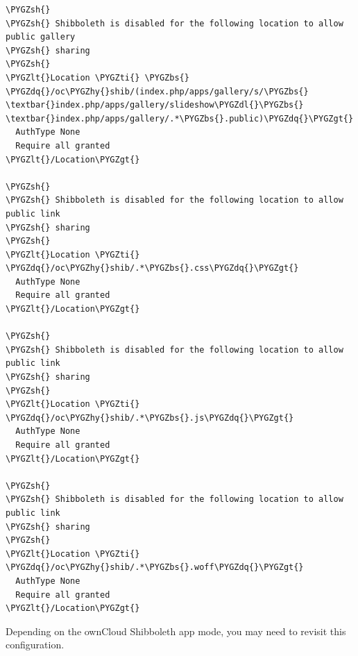 \documentclass[letterpaper,10pt,english]{sphinxmanual}
\def\PYGZbs{\char`\\}
\def\PYGZlt{\char`\<}
\def\PYGZgt{\char`\>}
\def\PYGZsh{\char`\#}
\def\PYGZdl{\char`\$}
\def\PYGZhy{\char`\-}
\def\PYGZdq{\char`\"}
\def\PYGZti{\char`\~}
\begin{document}
\begin{Verbatim}[commandchars=\\\{\}]
\PYGZsh{}
\PYGZsh{} Shibboleth is disabled for the following location to allow public gallery
\PYGZsh{} sharing
\PYGZsh{}
\PYGZlt{}Location \PYGZti{} \PYGZbs{}
\PYGZdq{}/oc\PYGZhy{}shib/(index.php/apps/gallery/s/\PYGZbs{}
\textbar{}index.php/apps/gallery/slideshow\PYGZdl{}\PYGZbs{}
\textbar{}index.php/apps/gallery/.*\PYGZbs{}.public)\PYGZdq{}\PYGZgt{}
  AuthType None
  Require all granted
\PYGZlt{}/Location\PYGZgt{}

\PYGZsh{}
\PYGZsh{} Shibboleth is disabled for the following location to allow public link
\PYGZsh{} sharing
\PYGZsh{}
\PYGZlt{}Location \PYGZti{} \PYGZdq{}/oc\PYGZhy{}shib/.*\PYGZbs{}.css\PYGZdq{}\PYGZgt{}
  AuthType None
  Require all granted
\PYGZlt{}/Location\PYGZgt{}

\PYGZsh{}
\PYGZsh{} Shibboleth is disabled for the following location to allow public link
\PYGZsh{} sharing
\PYGZsh{}
\PYGZlt{}Location \PYGZti{} \PYGZdq{}/oc\PYGZhy{}shib/.*\PYGZbs{}.js\PYGZdq{}\PYGZgt{}
  AuthType None
  Require all granted
\PYGZlt{}/Location\PYGZgt{}

\PYGZsh{}
\PYGZsh{} Shibboleth is disabled for the following location to allow public link
\PYGZsh{} sharing
\PYGZsh{}
\PYGZlt{}Location \PYGZti{} \PYGZdq{}/oc\PYGZhy{}shib/.*\PYGZbs{}.woff\PYGZdq{}\PYGZgt{}
  AuthType None
  Require all granted
\PYGZlt{}/Location\PYGZgt{}
\end{Verbatim}

Depending on the ownCloud Shibboleth app mode, you may need to revisit this
configuration.
\end{document}
